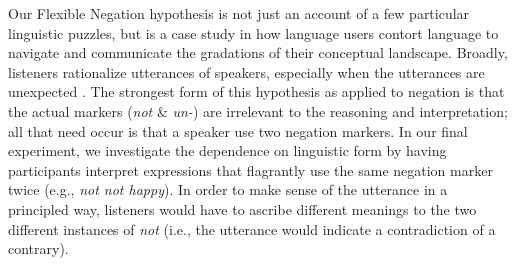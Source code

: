 \documentclass[floatsintext,doc]{apa6}
\newcommand{\ourmodel}{Flexible Negation\xspace}
\begin{document}


Our \ourmodel hypothesis is not just an account of a few particular linguistic puzzles, but is a case study in how language users contort language to navigate and communicate the gradations of their conceptual landscape.
Broadly, listeners rationalize utterances of speakers, especially when the utterances are unexpected \cite{Grice1975}.
The strongest form of this hypothesis as applied to negation is that the actual markers (\emph{not} \& \emph{un-}) are irrelevant to the reasoning and interpretation; all that need occur is that a speaker use two negation markers. 
In our final experiment, we investigate the dependence on linguistic form by having participants interpret expressions that flagrantly use the same negation marker twice (e.g., \emph{not not happy}).
In order to make sense of the utterance in a principled way, listeners would have to ascribe different meanings to the two different instances of \emph{not} (i.e., the utterance would indicate a contradiction of a contrary). 
\end{document}
